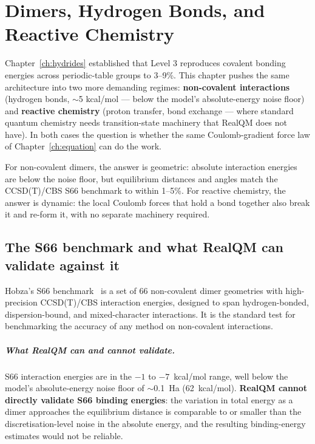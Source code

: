 \chapter{Dimers, Hydrogen Bonds, and Reactive Chemistry}\label{ch:dimers}

Chapter~\ref{ch:hydrides} established that Level 3 reproduces covalent bonding energies across periodic-table groups to 3--9\%. This chapter pushes the same architecture into two more demanding regimes: \textbf{non-covalent interactions} (hydrogen bonds, $\sim$5 kcal/mol --- below the model's absolute-energy noise floor) and \textbf{reactive chemistry} (proton transfer, bond exchange --- where standard quantum chemistry needs transition-state machinery that RealQM does not have). In both cases the question is whether the same Coulomb-gradient force law of Chapter~\ref{ch:equation} can do the work.

For non-covalent dimers, the answer is geometric: absolute interaction energies are below the noise floor, but equilibrium distances and angles match the CCSD(T)/CBS S66 benchmark to within 1--5\%. For reactive chemistry, the answer is dynamic: the local Coulomb forces that hold a bond together also break it and re-form it, with no separate machinery required.

\section{The S66 benchmark and what RealQM can validate against it}\label{sec:s66-setup}

Hobza's S66 benchmark~\cite{S66ref} is a set of 66 non-covalent dimer geometries with high-precision CCSD(T)/CBS interaction energies, designed to span hydrogen-bonded, dispersion-bound, and mixed-character interactions. It is the standard test for benchmarking the accuracy of any method on non-covalent interactions.

\paragraph{What RealQM can and cannot validate.}
S66 interaction energies are in the $-1$ to $-7$~kcal/mol range, well below the model's absolute-energy noise floor of $\sim$0.1~Ha (62~kcal/mol). \textbf{RealQM cannot directly validate S66 binding energies}: the variation in total energy as a dimer approaches the equilibrium distance is comparable to or smaller than the discretisation-level noise in the absolute energy, and the resulting binding-energy estimates would not be reliable.

